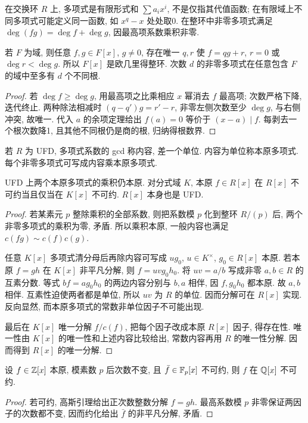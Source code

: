 在交换环 $R$ 上, 多项式是有限形式和 $\sum a_ix^i$, 不是仅指其代值函数; 在有限域上不同多项式可能定义同一函数, 如 $x^q-x$ 处处取0. 在整环中非零多项式满足 $\deg(fg)=\deg f+\deg g$, 因最高项系数乘积非零.
\begin{theorem}
若 $F$ 为域, 则任意 $f,g\in F[x]$, $g\ne0$, 存在唯一 $q,r$ 使 $f=qg+r$, $r=0$ 或 $\deg r<\deg g$. 所以 $F[x]$ 是欧几里得整环. 次数 $d$ 的非零多项式在任意包含 $F$ 的域中至多有 $d$ 个不同根.
\end{theorem}
\begin{proof}
若 $\deg f\ge\deg g$, 用最高项之比乘相应 $x$ 幂消去 $f$ 最高项; 次数严格下降, 迭代终止. 两种除法相减时 $(q-q')g=r'-r$, 非零左侧次数至少 $\deg g$, 与右侧冲突, 故唯一. 代入 $a$ 的余项定理给出 $f(a)=0$ 等价于 $(x-a)\mid f$. 每剥去一个根次数降1, 且其他不同根仍是商的根, 归纳得根数界.
\end{proof}
若 $R$ 为 UFD, 多项式系数的 gcd 称内容, 差一个单位. 内容为单位称本原多项式. 每个非零多项式可写成内容乘本原多项式.
\begin{lemma}[高斯]\label{lem:gauss}
UFD 上两个本原多项式的乘积仍本原. 对分式域 $K$, 本原 $f\in R[x]$ 在 $R[x]$ 不可约当且仅当在 $K[x]$ 不可约. $R[x]$ 本身也是 UFD.
\end{lemma}
\begin{proof}
若某素元 $p$ 整除乘积的全部系数, 则把系数模 $p$ 化到整环 $R/(p)$ 后, 两个非零多项式的乘积为零, 矛盾. 所以乘积本原, 一般内容也满足 $c(fg)\sim c(f)c(g)$.

任意 $K[x]$ 多项式清分母后再除内容可写成 $u g_0$, $u\in K^\times$, $g_0\in R[x]$ 本原. 若本原 $f=gh$ 在 $K[x]$ 非平凡分解, 则 $f=uvg_0h_0$. 将 $uv=a/b$ 写成非零 $a,b\in R$ 的互素分数. 等式 $bf=ag_0h_0$ 的两边内容分别与 $b,a$ 相伴, 因 $f,g_0h_0$ 都本原. 故 $a,b$ 相伴. 互素性迫使两者都是单位, 所以 $uv$ 为 $R$ 的单位. 因而分解可在 $R[x]$ 实现. 反向显然, 而本原多项式的常数非单位因子不可能出现.

最后在 $K[x]$ 唯一分解 $f/c(f)$, 把每个因子改成本原 $R[x]$ 因子, 得存在性. 唯一性由 $K[x]$ 的唯一性和上述内容比较给出, 常数内容再用 $R$ 的唯一性分解. 因而得到 $R[x]$ 的唯一分解.
\end{proof}
\begin{proposition}
设 $f\in\mathbb Z[x]$ 本原, 模素数 $p$ 后次数不变, 且 $\bar f\in\mathbb F_p[x]$ 不可约, 则 $f$ 在 $\mathbb Q[x]$ 不可约.
\end{proposition}
\begin{proof}
若可约, 高斯引理给出正次数整数分解 $f=gh$. 最高系数模 $p$ 非零保证两因子的次数都不变, 因而约化给出 $\bar f$ 的非平凡分解, 矛盾.
\end{proof}
